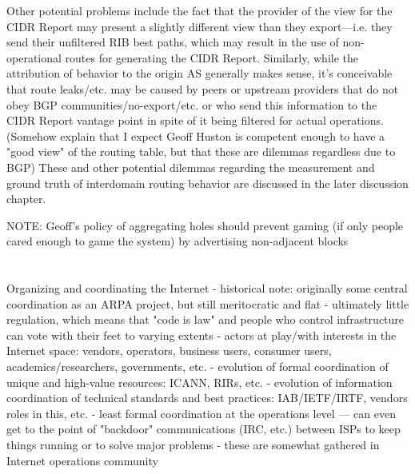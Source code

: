 Other potential problems include the fact that the provider of the view for the CIDR Report may present a slightly different view than they export---i.e. they send their unfiltered RIB best paths, which may result in the use of non-operational routes for generating the CIDR Report. Similarly, while the attribution of behavior to the origin AS generally makes sense, it's conceivable that route leaks/etc. may be caused by peers or upstream providers that do not obey BGP communities/no-export/etc. or who send this information to the CIDR Report vantage point in spite of it being filtered for actual operations. (Somehow explain that I expect Geoff Huston is competent enough to have a "good view" of the routing table, but that these are dilemmas regardless due to BGP) These and other potential dilemmas regarding the measurement and ground truth of interdomain routing behavior are discussed in the later discussion chapter.

NOTE: Geoff's policy of aggregating holes should prevent gaming (if only people cared enough to game the system) by advertising non-adjacent blocks

% 

\section{}

Organizing and coordinating the Internet
       - historical note: originally some central coordination as an
         ARPA project, but still meritocratic and flat
       - ultimately little regulation, which means that "code is law"
         and people who control infrastructure can vote with their
         feet to varying extents
       - actors at play/with interests in the Internet space: vendors,
         operators, business users, consumer users,
         academics/researchers, governments, etc.
       - evolution of formal coordination of unique and high-value
         resources: ICANN, RIRs, etc.
       - evolution of information coordination of technical standards
         and best practices: IAB/IETF/IRTF, vendors roles in this, etc.
       - least formal coordination at the operations level — can even
         get to the point of "backdoor" communications (IRC, etc.)
         between ISPs to keep things running or to solve major problems
       - these are somewhat gathered in Internet operations community

